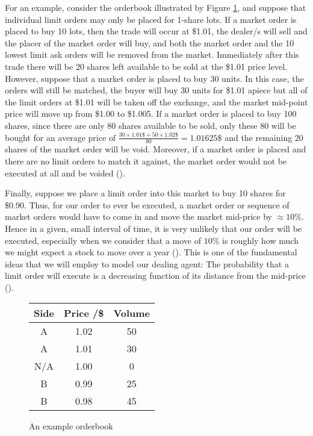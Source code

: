 For an example, consider the orderbook illustrated by Figure \ref{fig:orderbook}, and
suppose that individual limit orders may only be placed for 1-share lots. If a market 
order is placed to buy 10 lots, then the trade will occur at \$1.01, the dealer/s will 
sell and the placer of the market order will buy, and both the market order and the 10
lowest limit ask orders will be removed from the market. Immediately after this 
trade there will be 20 shares left available to be sold at the \$1.01 price level. 
However, suppose that a market order is placed to buy 30 units. In this case, the 
orders will still be matched, the buyer will buy 30 units for \$1.01 apiece but all of 
the limit orders at \$1.01 will be taken off the exchange, and the market mid-point 
price will move up from \$1.00 to \$1.005. If a market order is placed to buy 100
shares, since there are only 80 shares available to be sold, only these 80 will be 
bought for an average price of $\frac{30\times1.01\$+50\times1.02\$}{80}=1.01625\$$
and the remaining 20 shares of the market order will be void.
Moreover, if a market order is placed and there are no limit orders to match 
it against, the market order would not be executed at all and be voided (\cite{trading}).

Finally, suppose we place a limit 
order into this market to buy 10 shares for \$0.90. Thus, for our order to ever be 
executed, a market order or sequence of market orders would have to come in and move
the market mid-price by $\approx10\%$. Hence in a 
given, small interval of time, it is very unlikely that our order will
be executed, especially when we consider that a move of $10\%$ is roughly how 
much we might expect a stock to move over a year (\cite{SP500}). This is one of the fundamental 
ideas that we will employ to model our 
dealing agent: The probability that a limit order will execute is a decreasing 
function of its distance from the mid-price (\cite{AS2008}).

\begin{figure}
\centering
    \begin{tabular}{ |c|c|c| } 
        \hline
        Side & Price /\$ & Volume \\ 
        \hline
        A & 1.02 & 50 \\
        A & 1.01 & 30 \\
        N/A & 1.00 & 0 \\
        B & 0.99 & 25 \\ 
        B & 0.98 & 45 \\
        \hline
    \end{tabular}
    \caption{An example orderbook}
    \label{fig:orderbook}
\end{figure}

